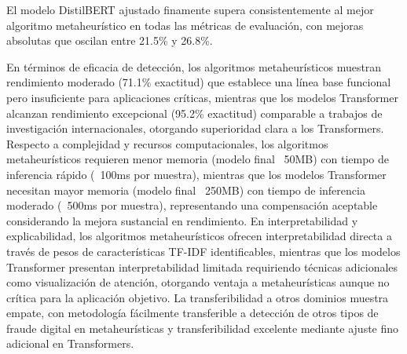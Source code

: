 \begin{table}[htbp]
\centering
{}
\caption{Comparación cuantitativa final entre el mejor algoritmo metaheurístico y el modelo Transformer optimizado.}
\label{tab:comparacion_final_paradigmas}
\end{table}

El modelo DistilBERT ajustado finamente supera consistentemente al mejor algoritmo metaheurístico en todas las métricas de evaluación, con mejoras absolutas que oscilan entre 21.5\% y 26.8\%.

En términos de eficacia de detección, los algoritmos metaheurísticos muestran rendimiento moderado (71.1\% exactitud) que establece una línea base funcional pero insuficiente para aplicaciones críticas, mientras que los modelos Transformer alcanzan rendimiento excepcional (95.2\% exactitud) comparable a trabajos de investigación internacionales, otorgando superioridad clara a los Transformers. Respecto a complejidad y recursos computacionales, los algoritmos metaheurísticos requieren menor memoria (modelo final ~50MB) con tiempo de inferencia rápido (~100ms por muestra), mientras que los modelos Transformer necesitan mayor memoria (modelo final ~250MB) con tiempo de inferencia moderado (~500ms por muestra), representando una compensación aceptable considerando la mejora sustancial en rendimiento. En interpretabilidad y explicabilidad, los algoritmos metaheurísticos ofrecen interpretabilidad directa a través de pesos de características TF-IDF identificables, mientras que los modelos Transformer presentan interpretabilidad limitada requiriendo técnicas adicionales como visualización de atención, otorgando ventaja a metaheurísticas aunque no crítica para la aplicación objetivo. La transferibilidad a otros dominios muestra empate, con metodología fácilmente transferible a detección de otros tipos de fraude digital en metaheurísticas y transferibilidad excelente mediante ajuste fino adicional en Transformers.

